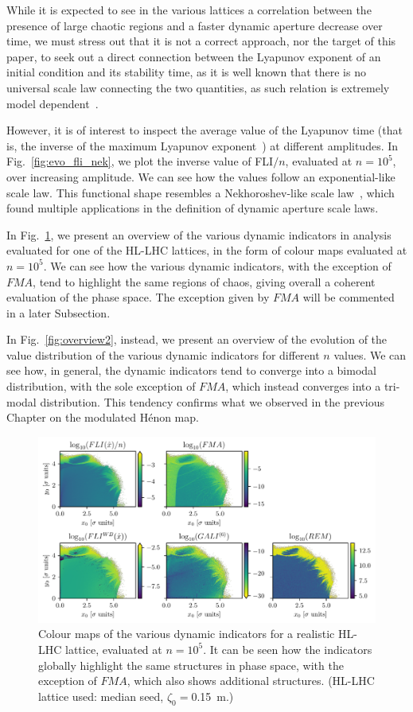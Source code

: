 While it is expected to see in the various lattices a correlation between the presence of large chaotic regions and a faster dynamic aperture decrease over time, we must stress out that it is not a correct approach, nor the target of this paper, to seek out a direct connection between the Lyapunov exponent of an initial condition and its stability time, as it is well known that there is no universal scale law connecting the two quantities, as such relation is extremely model dependent~\cite{Morbidelli1995}.

However, it is of interest to inspect the average value of the Lyapunov time (that is, the inverse of the maximum Lyapunov exponent~\cite{Tancredi_2001}) at different amplitudes. In Fig.~\ref{fig:evo_fli_nek}, we plot the inverse value of FLI$/n$, evaluated at $n=10^5$, over increasing amplitude. We can see how the values follow an exponential-like scale law. This functional shape resembles a Nekhoroshev-like scale law~\cite{}, which found multiple applications in the definition of dynamic aperture scale laws.

In Fig.~\ref{fig:overview}, we present an overview of the various dynamic indicators in analysis evaluated for one of the HL-LHC lattices, in the form of colour maps evaluated at $n=10^5$. We can see how the various dynamic indicators, with the exception of $FMA$, tend to highlight the same regions of chaos, giving overall a coherent evaluation of the phase space. The exception given by $FMA$ will be commented in a later Subsection. 

In Fig.~\ref{fig:overview2}, instead, we present an overview of the evolution of the value distribution of the various dynamic indicators for different $n$ values. We can see how, in general, the dynamic indicators tend to converge into a bimodal distribution, with the sole exception of $FMA$, which instead converges into a tri-modal distribution. This tendency confirms what we observed in the previous Chapter on the modulated Hénon map.

\begin{figure}
    \centering
    \includegraphics[width=1.0\textwidth]{6_lhc_dynamic_indicators/figs/overview.pdf}
    \caption{Colour maps of the various dynamic indicators for a realistic HL-LHC lattice, evaluated at $n=10^5$. It can be seen how the indicators globally highlight the same structures in phase space, with the exception of $FMA$, which also shows additional structures. (HL-LHC lattice used: median seed, $\zeta_0=$\SI{0.15}{\meter}.)}
    \label{fig:overview}
\end{figure}

